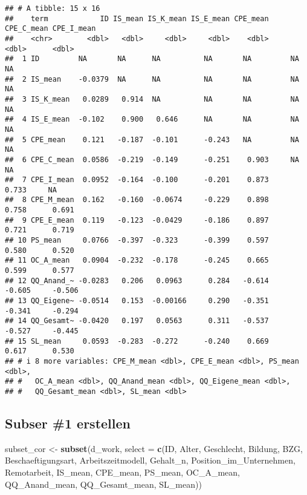 \documentclass[
]{article}
\newenvironment{Shaded}{\begin{snugshade}}{\end{snugshade}}
\newcommand{\AttributeTok}[1]{\textcolor[rgb]{0.13,0.29,0.53}{#1}}
\newcommand{\FunctionTok}[1]{\textcolor[rgb]{0.13,0.29,0.53}{\textbf{#1}}}
\newcommand{\NormalTok}[1]{#1}
\newcommand{\OtherTok}[1]{\textcolor[rgb]{0.56,0.35,0.01}{#1}}
\begin{document}
\begin{verbatim}
## # A tibble: 15 x 16
##    term            ID IS_mean IS_K_mean IS_E_mean CPE_mean CPE_C_mean CPE_I_mean
##    <chr>        <dbl>   <dbl>     <dbl>     <dbl>    <dbl>      <dbl>      <dbl>
##  1 ID         NA       NA      NA          NA       NA         NA         NA    
##  2 IS_mean    -0.0379  NA      NA          NA       NA         NA         NA    
##  3 IS_K_mean   0.0289   0.914  NA          NA       NA         NA         NA    
##  4 IS_E_mean  -0.102    0.900   0.646      NA       NA         NA         NA    
##  5 CPE_mean    0.121   -0.187  -0.101      -0.243   NA         NA         NA    
##  6 CPE_C_mean  0.0586  -0.219  -0.149      -0.251    0.903     NA         NA    
##  7 CPE_I_mean  0.0952  -0.164  -0.100      -0.201    0.873      0.733     NA    
##  8 CPE_M_mean  0.162   -0.160  -0.0674     -0.229    0.898      0.758      0.691
##  9 CPE_E_mean  0.119   -0.123  -0.0429     -0.186    0.897      0.721      0.719
## 10 PS_mean     0.0766  -0.397  -0.323      -0.399    0.597      0.580      0.520
## 11 OC_A_mean   0.0904  -0.232  -0.178      -0.245    0.665      0.599      0.577
## 12 QQ_Anand_~ -0.0283   0.206   0.0963      0.284   -0.614     -0.605     -0.506
## 13 QQ_Eigene~ -0.0514   0.153  -0.00166     0.290   -0.351     -0.341     -0.294
## 14 QQ_Gesamt~ -0.0420   0.197   0.0563      0.311   -0.537     -0.527     -0.445
## 15 SL_mean     0.0593  -0.283  -0.272      -0.240    0.669      0.617      0.530
## # i 8 more variables: CPE_M_mean <dbl>, CPE_E_mean <dbl>, PS_mean <dbl>,
## #   OC_A_mean <dbl>, QQ_Anand_mean <dbl>, QQ_Eigene_mean <dbl>,
## #   QQ_Gesamt_mean <dbl>, SL_mean <dbl>
\end{verbatim}

\subsection{Subser \#1 erstellen}\label{subser-1-erstellen}

\begin{Shaded}
\begin{Highlighting}[]
\NormalTok{subset\_cor }\OtherTok{\textless{}{-}} \FunctionTok{subset}\NormalTok{(d\_work,}
                     \AttributeTok{select =} \FunctionTok{c}\NormalTok{(ID, Alter, Geschlecht, Bildung, BZG, Beschaeftigungsart, Arbeitszeitmodell, Gehalt\_n, Position\_im\_Unternehmen, Remotarbeit, IS\_mean, CPE\_mean, PS\_mean, OC\_A\_mean, QQ\_Anand\_mean, QQ\_Gesamt\_mean, SL\_mean))}
\end{Highlighting}
\end{Shaded}
\end{document}

